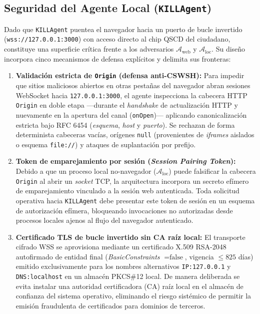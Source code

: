 \documentclass[runningheads,twocolumn]{llncs}
\begin{document}
\subsection{Seguridad del Agente Local (\texttt{KILLAgent})}\label{sec:killagent_security}
Dado que \texttt{KILLAgent} puentea el navegador hacia un puerto de bucle invertido (\texttt{wss://127.0.0.1:3000}) con acceso directo al chip QSCD del ciudadano, constituye una superficie crítica frente a los adversarios $\mathcal{A}_{\text{web}}$ y $\mathcal{A}_{\text{loc}}$. Su diseño incorpora cinco mecanismos de defensa explícitos y delimita sus fronteras:
\begin{enumerate}
    \item \textbf{Validación estricta de \texttt{Origin} (defensa anti-CSWSH):} Para impedir que sitios maliciosos abiertos en otras pestañas del navegador abran sesiones WebSocket hacia \texttt{127.0.0.1:3000}, el agente inspecciona la cabecera HTTP \texttt{Origin} en doble etapa ---durante el \textit{handshake} de actualización HTTP y nuevamente en la apertura del canal (\texttt{onOpen})--- aplicando canonicalización estricta bajo RFC 6454 \cite{rfc6454} (\textit{esquema}, \textit{host} y \textit{puerto}). Se rechazan de forma determinista cabeceras vacías, orígenes \texttt{\textquotedbl null\textquotedbl} (provenientes de \textit{iframes} aislados o esquema \texttt{file://}) y ataques de suplantación por prefijo.
    \item \textbf{Token de emparejamiento por sesión (\textit{Session Pairing Token}):} Debido a que un proceso local no-navegador ($\mathcal{A}_{\text{loc}}$) puede falsificar la cabecera \texttt{Origin} al abrir un \textit{socket} TCP, la arquitectura incorpora un secreto efímero de emparejamiento vinculado a la sesión web autenticada. Toda solicitud operativa hacia \texttt{KILLAgent} debe presentar este token de sesión en un esquema de autorización efímera, bloqueando invocaciones no autorizadas desde procesos locales ajenos al flujo del navegador autenticado.
    \item \textbf{Certificado TLS de bucle invertido sin CA raíz local:} El transporte cifrado WSS se aprovisiona mediante un certificado X.509 RSA-2048 autofirmado de entidad final (\textit{BasicConstraints} $= \text{false}$, vigencia $\le 825$ días) emitido exclusivamente para los nombres alternativos \texttt{IP:127.0.0.1} y \texttt{DNS:localhost} en un almacén PKCS\#12 local. De manera deliberada se evita instalar una autoridad certificadora (CA) raíz local en el almacén de confianza del sistema operativo, eliminando el riesgo sistémico de permitir la emisión fraudulenta de certificados para dominios de terceros.

\end{enumerate}
\end{document}
